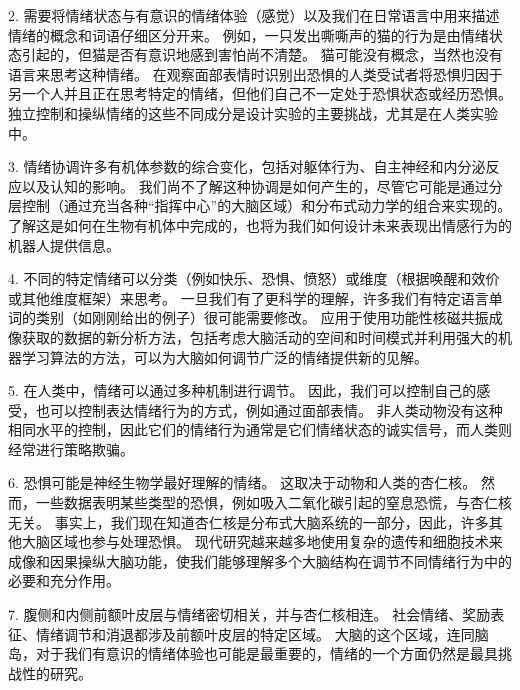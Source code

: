 2. 需要将情绪状态与有意识的情绪体验（感觉）以及我们在日常语言中用来描述情绪的概念和词语仔细区分开来。
例如，一只发出嘶嘶声的猫的行为是由情绪状态引起的，但猫是否有意识地感到害怕尚不清楚。
猫可能没有概念，当然也没有语言来思考这种情绪。
在观察面部表情时识别出恐惧的人类受试者将恐惧归因于另一个人并且正在思考特定的情绪，但他们自己不一定处于恐惧状态或经历恐惧。
独立控制和操纵情绪的这些不同成分是设计实验的主要挑战，尤其是在人类实验中。


3. 情绪协调许多有机体参数的综合变化，包括对躯体行为、自主神经和内分泌反应以及认知的影响。
我们尚不了解这种协调是如何产生的，尽管它可能是通过分层控制（通过充当各种“指挥中心”的大脑区域）和分布式动力学的组合来实现的。
了解这是如何在生物有机体中完成的，也将为我们如何设计未来表现出情感行为的机器人提供信息。


4. 不同的特定情绪可以分类（例如快乐、恐惧、愤怒）或维度（根据唤醒和效价或其他维度框架）来思考。
一旦我们有了更科学的理解，许多我们有特定语言单词的类别（如刚刚给出的例子）很可能需要修改。
应用于使用功能性核磁共振成像获取的数据的新分析方法，包括考虑大脑活动的空间和时间模式并利用强大的机器学习算法的方法，可以为大脑如何调节广泛的情绪提供新的见解。


5. 在人类中，情绪可以通过多种机制进行调节。
因此，我们可以控制自己的感受，也可以控制表达情绪行为的方式，例如通过面部表情。
非人类动物没有这种相同水平的控制，因此它们的情绪行为通常是它们情绪状态的诚实信号，而人类则经常进行策略欺骗。


6. 恐惧可能是神经生物学最好理解的情绪。
这取决于动物和人类的杏仁核。
然而，一些数据表明某些类型的恐惧，例如吸入二氧化碳引起的窒息恐慌，与杏仁核无关。
事实上，我们现在知道杏仁核是分布式大脑系统的一部分，因此，许多其他大脑区域也参与处理恐惧。
现代研究越来越多地使用复杂的遗传和细胞技术来成像和因果操纵大脑功能，使我们能够理解多个大脑结构在调节不同情绪行为中的必要和充分作用。


7. 腹侧和内侧前额叶皮层与情绪密切相关，并与杏仁核相连。
社会情绪、奖励表征、情绪调节和消退都涉及前额叶皮层的特定区域。
大脑的这个区域，连同脑岛，对于我们有意识的情绪体验也可能是最重要的，情绪的一个方面仍然是最具挑战性的研究。

